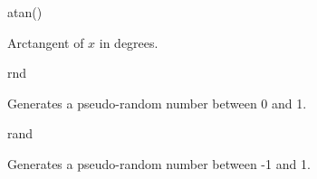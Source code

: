 \begin{math-function}{atan()}

	Arctangent of $x$ in degrees. 

\begin{codeexample}[post=\tt\footnotesize\pgfmathresult]
\end{codeexample}

\end{math-function}

\begin{math-function}{rnd}

	Generates a pseudo-random number between 0 and 1.

\begin{codeexample}[post=\tt\footnotesize\pgfmathresult]
\end{codeexample}

\begin{codeexample}[post=\tt\footnotesize\pgfmathresult]
\end{codeexample}

\begin{codeexample}[post=\tt\footnotesize\pgfmathresult]
\end{codeexample}

\end{math-function}

\begin{math-function}{rand}

	Generates a pseudo-random number between -1 and 1.

\begin{codeexample}[post=\tt\footnotesize\pgfmathresult]
\end{codeexample}

\begin{codeexample}[post=\tt\footnotesize\pgfmathresult]
\end{codeexample}

\end{math-function}
